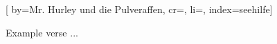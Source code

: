 
[%
    by={Mr. Hurley und die Pulveraffen},
    cr={},
    li={},
    index={seehilfe}]


    \label{seehilfe}

    \beginverse
        Example verse ...
    \endverse
\endsong
